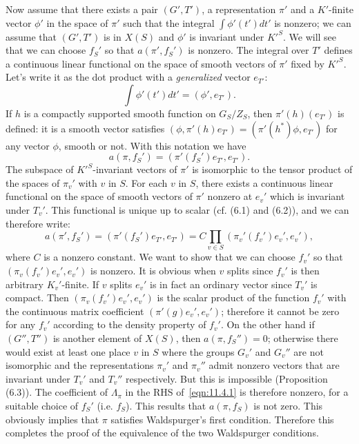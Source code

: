 Now assume that there exists a pair $(G', T')$, a representation $\pi'$ and a $K'$-finite vector $\phi'$ in the space of $\pi'$ such that the integral $\int \phi'(t')dt'$ is nonzero; we can assume that $(G', T')$ is in $X(S)$ and $\phi'$ is invariant under $K'^S$.
We will see that we can choose $f_S'$ so that $a(\pi', f_S')$ is nonzero.
The integral over $T'$ defines a continuous linear functional on the space of smooth vectors of $\pi'$ fixed by $K'^S$.
Let's write it as the dot product with a \emph{generalized} vector $e_{T'}$:
\begin{equation*}
    \int \phi'(t') dt' = (\phi', e_{T'}).
\end{equation*}
If $h$ is a compactly supported smooth function on $G_S / Z_S$, then $\pi'(h)(e_{T'})$ is defined: it is a smooth vector satisfies $(\phi, \pi'(h)e_{T'}) = (\pi'(h^*)\phi, e_{T'})$ for any vector $\phi$, smooth or not.
With this notation we have
\begin{equation*}
    a(\pi, f_S') = (\pi'(f_S')e_{T'}, e_{T'}).
\end{equation*}
The subspace of $K'^S$-invariant vectors of $\pi'$ is isomorphic to the tensor product of the spaces of $\pi_v'$ with $v$ in $S$.
For each $v$ in $S$, there exists a continuous linear functional on the space of smooth vectors of $\pi'$ nonzero at $e_v'$ which is invariant under $T_v'$.
This functional is unique up to scalar (cf. (6.1) and (6.2)), and we can therefore write:
\begin{equation*}
    a(\pi', f_S') = (\pi'(f_S')e_{T'}, e_{T'}) = C \prod_{v\in S} (\pi_v'(f_v')e_v', e_v'),
\end{equation*}
where $C$ is a nonzero constant.
We want to show that we can choose $f_v'$ so that $(\pi_v(f_v')e_v', e_v')$ is nonzero.
It is obvious when $v$ splits since $f_v'$ is then arbitrary $K_v'$-finite.
If $v$ splits $e_v'$ is in fact an ordinary vector since $T_v'$ is compact.
Then $(\pi_v(f_v')e_v', e_v')$ is the scalar product of the function $f_v'$ with the continuous matrix coefficient $(\pi'(g)e_v', e_v')$; therefore it cannot be zero for any $f_v'$ according to the density property of $f_v'$.
On the other hand if $(G'', T'')$ is another element of $X(S)$, then $a(\pi, f_S'')=0$; otherwise there would exist at least one place $v$ in $S$ where the groups $G_v'$ and $G_v''$ are not isomorphic and the representations $\pi_v'$ and $\pi_v''$ admit nonzero vectors that are invariant under $T_v'$ and $T_v''$ respectively.
But this is impossible (Proposition (6.3)).
The coefficient of $\Lambda_\pi$ in the RHS of~\eqref{eqn:11.4.1} is therefore nonzero, for a suitable choice of $f_S'$ (i.e. $f_S$).
This results that $a(\pi, f_S)$ is not zero.
This obviously implies that $\pi$ satisfies Waldspurger's first condition.
Therefore this completes the proof of the equivalence of the two Waldspurger conditions.